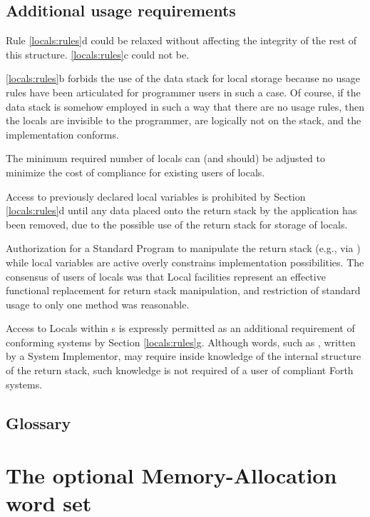\setcounter{subsection}{2}
\subsection{Additional usage requirements} %

Rule \ref{locals:rules}d could be relaxed without affecting the
integrity of the rest of this structure. \ref{locals:rules}c could
not be.

\ref{locals:rules}b forbids the use of the data stack for local
storage because no usage rules have been articulated for programmer
users in such a case. Of course, if the data stack is somehow employed
in such a way that there are no usage rules, then the locals are
invisible to the programmer, are logically not on the stack, and the
implementation conforms.

The minimum required number of locals can (and should) be adjusted to
minimize the cost of compliance for existing users of locals.

Access to previously declared local variables is prohibited by Section
\ref{locals:rules}d until any data placed onto the return stack by the
application has been removed, due to the possible use of the return
stack for storage of locals.

Authorization for a Standard Program to manipulate the return stack
(e.g., via  ) while local variables
are active overly constrains implementation possibilities. The consensus
of users of locals was that Local facilities represent an effective
functional replacement for return stack manipulation, and restriction
of standard usage to only one method was reasonable.

Access to Locals within s is
expressly permitted as an additional requirement of conforming systems
by Section \ref{locals:rules}g. Although words, such as ,
written by a System Implementor, may require inside knowledge of the
internal structure of the return stack, such knowledge is not required
of a user of compliant Forth systems.

\setcounter{subsection}{5}
\subsection{Glossary} %



\section{The optional Memory-Allocation word set} %
\label{rat:memory}

